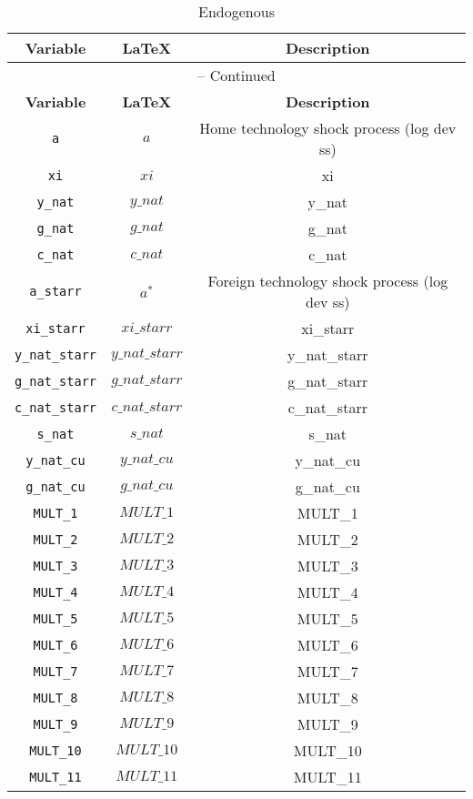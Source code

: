 \begin{center}
\begin{longtable}{ccc}
\caption{Endogenous}\\%
\hline%
\multicolumn{1}{c}{\textbf{Variable}} &
\multicolumn{1}{c}{\textbf{\LaTeX}} &
\multicolumn{1}{c}{\textbf{Description}}\\%
\hline\hline%
\endfirsthead
\multicolumn{3}{c}{{\tablename} \thetable{} -- Continued}\\%
\hline%
\multicolumn{1}{c}{\textbf{Variable}} &
\multicolumn{1}{c}{\textbf{\LaTeX}} &
\multicolumn{1}{c}{\textbf{Description}}\\%
\hline\hline%
\endhead
\texttt{a} & ${a}$ & Home technology shock process (log dev ss)\\
\texttt{xi} & $xi$ & xi\\
\texttt{y\_nat} & $y\_nat$ & y\_nat\\
\texttt{g\_nat} & $g\_nat$ & g\_nat\\
\texttt{c\_nat} & $c\_nat$ & c\_nat\\
\texttt{a\_starr} & ${a^*}$ & Foreign technology shock process (log dev ss)\\
\texttt{xi\_starr} & $xi\_starr$ & xi\_starr\\
\texttt{y\_nat\_starr} & $y\_nat\_starr$ & y\_nat\_starr\\
\texttt{g\_nat\_starr} & $g\_nat\_starr$ & g\_nat\_starr\\
\texttt{c\_nat\_starr} & $c\_nat\_starr$ & c\_nat\_starr\\
\texttt{s\_nat} & $s\_nat$ & s\_nat\\
\texttt{y\_nat\_cu} & $y\_nat\_cu$ & y\_nat\_cu\\
\texttt{g\_nat\_cu} & $g\_nat\_cu$ & g\_nat\_cu\\
\texttt{MULT\_1} & $MULT\_1$ & MULT\_1\\
\texttt{MULT\_2} & $MULT\_2$ & MULT\_2\\
\texttt{MULT\_3} & $MULT\_3$ & MULT\_3\\
\texttt{MULT\_4} & $MULT\_4$ & MULT\_4\\
\texttt{MULT\_5} & $MULT\_5$ & MULT\_5\\
\texttt{MULT\_6} & $MULT\_6$ & MULT\_6\\
\texttt{MULT\_7} & $MULT\_7$ & MULT\_7\\
\texttt{MULT\_8} & $MULT\_8$ & MULT\_8\\
\texttt{MULT\_9} & $MULT\_9$ & MULT\_9\\
\texttt{MULT\_10} & $MULT\_10$ & MULT\_10\\
\texttt{MULT\_11} & $MULT\_11$ & MULT\_11\\
\hline%
\end{longtable}
\end{center}

